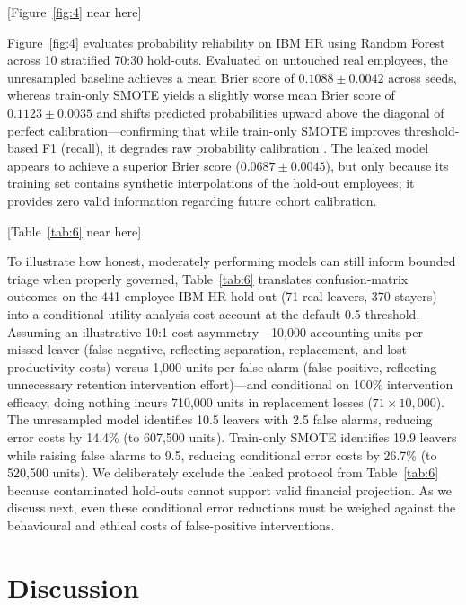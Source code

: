 \documentclass[12pt,a4paper]{article}
\begin{document}
\begin{center}
[Figure~\ref{fig:4} near here]
\end{center}

Figure~\ref{fig:4} evaluates probability reliability on IBM HR using Random Forest across 10 stratified 70:30 hold-outs. Evaluated on untouched real employees, the unresampled baseline achieves a mean Brier score of $0.1088 \pm 0.0042$ across seeds, whereas train-only SMOTE yields a slightly worse mean Brier score of $0.1123 \pm 0.0035$ and shifts predicted probabilities upward above the diagonal of perfect calibration---confirming that while train-only SMOTE improves threshold-based F1 (recall), it degrades raw probability calibration \parencite{ref9,ref41}. The leaked model appears to achieve a superior Brier score ($0.0687 \pm 0.0045$), but only because its training set contains synthetic interpolations of the hold-out employees; it provides zero valid information regarding future cohort calibration.

\begin{center}
[Table~\ref{tab:6} near here]
\end{center}

To illustrate how honest, moderately performing models can still inform bounded triage when properly governed, Table~\ref{tab:6} translates confusion-matrix outcomes on the 441-employee IBM HR hold-out (71 real leavers, 370 stayers) into a conditional utility-analysis cost account \parencite{ref20,ref35,ref34} at the default 0.5 threshold. Assuming an illustrative 10:1 cost asymmetry---10,000 accounting units per missed leaver (false negative, reflecting separation, replacement, and lost productivity costs) versus 1,000 units per false alarm (false positive, reflecting unnecessary retention intervention effort)---and conditional on 100\% intervention efficacy, doing nothing incurs 710,000 units in replacement losses ($71 \times 10{,}000$). The unresampled model identifies 10.5 leavers with 2.5 false alarms, reducing error costs by 14.4\% (to 607,500 units). Train-only SMOTE identifies 19.9 leavers while raising false alarms to 9.5, reducing conditional error costs by 26.7\% (to 520,500 units). We deliberately exclude the leaked protocol from Table~\ref{tab:6} because contaminated hold-outs cannot support valid financial projection. As we discuss next, even these conditional error reductions must be weighed against the behavioural and ethical costs of false-positive interventions.

\section{Discussion}
\label{sec:discussion}
\end{document}
